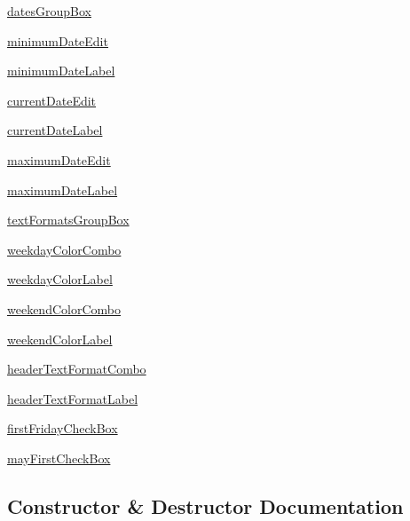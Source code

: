 \begin{DoxyCompactItemize}
\hyperlink{classcalendarwidget_1_1Window_a45f5919daf913823e9df763cd84ffc82}{dates\+Group\+Box}
\item 
\hyperlink{classcalendarwidget_1_1Window_a1cbe0701a0885bdca33c70ab98c929a4}{minimum\+Date\+Edit}
\item 
\hyperlink{classcalendarwidget_1_1Window_a7cc35cf11e6ad13a1506ed77b3e7a7be}{minimum\+Date\+Label}
\item 
\hyperlink{classcalendarwidget_1_1Window_a946c3334c594cdbb2f33a23d4eff83ea}{current\+Date\+Edit}
\item 
\hyperlink{classcalendarwidget_1_1Window_a501a8dec657edaf2518c1a0d9fbe787d}{current\+Date\+Label}
\item 
\hyperlink{classcalendarwidget_1_1Window_a6395f0ff768f80c72b964bad0bc737d3}{maximum\+Date\+Edit}
\item 
\hyperlink{classcalendarwidget_1_1Window_a1d0ee8924b9a9cc234927a38b1ef5da5}{maximum\+Date\+Label}
\item 
\hyperlink{classcalendarwidget_1_1Window_acc22822d589bd0f1dcf679c122b6eaec}{text\+Formats\+Group\+Box}
\item 
\hyperlink{classcalendarwidget_1_1Window_ad14d2e5f54bb497e0e2754971b6ad5da}{weekday\+Color\+Combo}
\item 
\hyperlink{classcalendarwidget_1_1Window_a975f7824b2067f0140b4a84dd4ab9065}{weekday\+Color\+Label}
\item 
\hyperlink{classcalendarwidget_1_1Window_ac61cc58bbc42119f28928fb9185375f2}{weekend\+Color\+Combo}
\item 
\hyperlink{classcalendarwidget_1_1Window_ab756f592f05dd37b78105b55b21166b8}{weekend\+Color\+Label}
\item 
\hyperlink{classcalendarwidget_1_1Window_a2412d27e251aaae0600848749564501f}{header\+Text\+Format\+Combo}
\item 
\hyperlink{classcalendarwidget_1_1Window_afa37a632fbc64a8f769ce8c14ac260d0}{header\+Text\+Format\+Label}
\item 
\hyperlink{classcalendarwidget_1_1Window_a934f5fae4d9f264ded56b074a7bb9440}{first\+Friday\+Check\+Box}
\item 
\hyperlink{classcalendarwidget_1_1Window_ae7e7a0c3c5727b24ffe0a6d8ae534511}{may\+First\+Check\+Box}
\end{DoxyCompactItemize}


\subsection{Constructor \& Destructor Documentation}
\hypertarget{classcalendarwidget_1_1Window_a7eee502b3fbb45552bb6952f4084909b}{}

